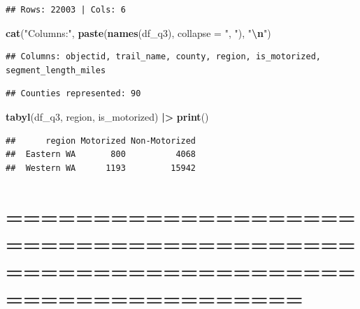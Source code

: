 \documentclass[
]{article}
\newenvironment{Shaded}{\begin{snugshade}}{\end{snugshade}}
\newcommand{\AttributeTok}[1]{\textcolor[rgb]{0.13,0.29,0.53}{#1}}
\newcommand{\FunctionTok}[1]{\textcolor[rgb]{0.13,0.29,0.53}{\textbf{#1}}}
\newcommand{\NormalTok}[1]{#1}
\newcommand{\SpecialCharTok}[1]{\textcolor[rgb]{0.81,0.36,0.00}{\textbf{#1}}}
\newcommand{\StringTok}[1]{\textcolor[rgb]{0.31,0.60,0.02}{#1}}
\begin{document}
\begin{verbatim}
## Rows: 22003 | Cols: 6
\end{verbatim}

\begin{Shaded}
\begin{Highlighting}[]
\FunctionTok{cat}\NormalTok{(}\StringTok{"Columns:"}\NormalTok{, }\FunctionTok{paste}\NormalTok{(}\FunctionTok{names}\NormalTok{(df\_q3), }\AttributeTok{collapse =} \StringTok{", "}\NormalTok{), }\StringTok{"}\SpecialCharTok{\textbackslash{}n}\StringTok{"}\NormalTok{)}
\end{Highlighting}
\end{Shaded}

\begin{verbatim}
## Columns: objectid, trail_name, county, region, is_motorized, segment_length_miles
\end{verbatim}

\begin{Shaded}
\end{Shaded}

\begin{verbatim}
## Counties represented: 90
\end{verbatim}

\begin{Shaded}
\begin{Highlighting}[]
\FunctionTok{tabyl}\NormalTok{(df\_q3, region, is\_motorized) }\SpecialCharTok{|\textgreater{}} \FunctionTok{print}\NormalTok{()}
\end{Highlighting}
\end{Shaded}

\begin{verbatim}
##      region Motorized Non-Motorized
##  Eastern WA       800          4068
##  Western WA      1193         15942
\end{verbatim}

\section{=============================================================================}\label{section-18}
\end{document}
